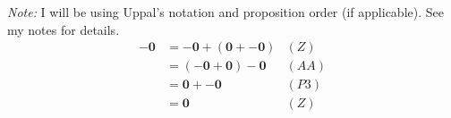\begin{sol}
\textit{Note:} I will be using Uppal's notation and proposition order (if applicable). See my notes for details.
\begin{align}
    -\bm{0} &= -\bm{0} + \left(\bm{0} + -\bm{0}\right) & (Z)\\ 
    &= \left(-\bm{0}+\bm{0}\right) - \bm{0} & (AA) \\ 
    &= \bm{0}  +- \bm{0} & (P3) \\ 
    &= \bm{0} & (Z)
\end{align}
\end{sol}